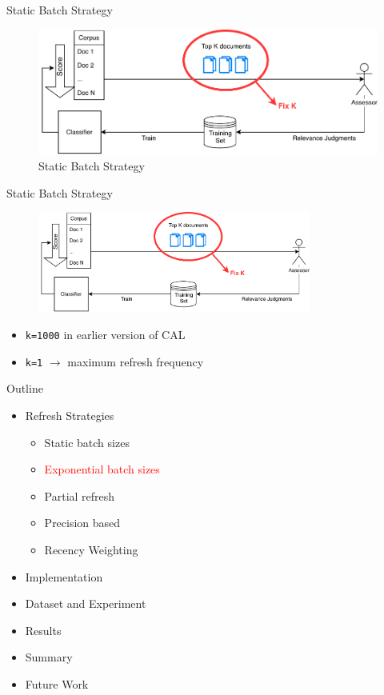 \documentclass[14pt]{beamer}
\newcommand{\red}[1]{\textcolor{red}{#1}}
\begin{document}
\begin{frame}{Static Batch Strategy}
\begin{figure}
 \centering 
 \includegraphics[width=1.0\textwidth]{animation/static.pdf}
 \caption{Static Batch Strategy}
\end{figure}
\end{frame}

\begin{frame}{Static Batch Strategy}
\begin{figure}
 \centering 
 \includegraphics[width=0.8\textwidth]{animation/static.pdf}
\end{figure}
\begin{itemize}
    \item \texttt{k=1000} in earlier version of CAL
    \item \texttt{k=1} $\rightarrow$ maximum refresh frequency
\end{itemize}
\end{frame}


\begin{frame}{Outline}
\begin{itemize}
    \item Refresh Strategies
    \begin{itemize}
        \item Static batch sizes
        \item \red{Exponential batch sizes}
        \item Partial refresh
        \item Precision based
        \item Recency Weighting
    \end{itemize}
    \item Implementation
    \item Dataset and Experiment
    \item Results
    \item Summary
    \item Future Work
\end{itemize}
\end{frame}
\end{document}
